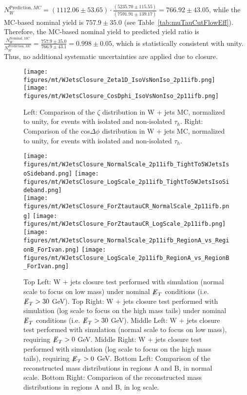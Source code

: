 $N_{W}^{\textrm{Prediction},MC} = (1112.06 \pm 53.65) \cdot \frac{(5235.70 \pm 115.55)}{(7591.91 \pm 139.17)} = 766.92 \pm 43.05$, while the MC-based nominal 
yield is $757.9 \pm 35.0$ (see Table~\ref{tab:muTauCutFlowEff}). Therefore, the MC-based nominal yield to predicted yield ratio is 
$\frac{N_{W}^{\textrm{Nominal},MC}}{N_{W}^{\textrm{Prediction},MC}} = \frac{757.9 \pm 35.0}{766.9 \pm 43.1} = 0.998 \pm 0.05$, which is statistically 
consistent with unity. 
Thus, no additional systematic uncertainties are applied due to closure.

\begin{figure}\centering
  \texttt{[image: figures/mt/WJetsClosure\_Zeta1D\_IsoVsNonIso\_2p11ifb.png]}
  \texttt{[image: figures/mt/WJetsClosure\_CosDphi\_IsoVsNonIso\_2p11ifb.png]}
  \caption{\label{fig:ZetaAndCosDphiVsTauIso} Left: Comparison of the $\zeta$ distribution in W + jets MC, normalized to unity, for events with isolated and 
non-isolated $\tau_{h}$.  Right: Comparison of the cos$\Delta\phi$ distribution in W + jets MC, normalized to unity, for events with isolated and
non-isolated $\tau_{h}$.}
\end{figure}

\begin{figure}\centering
  \texttt{[image: figures/mt/WJetsClosure\_NormalScale\_2p11ifb\_TightTo5WJetsIsoSideband.png]}
  \texttt{[image: figures/mt/WJetsClosure\_LogScale\_2p11ifb\_TightTo5WJetsIsoSideband.png]} \\
  \texttt{[image: figures/mt/WJetsClosure\_ForZtautauCR\_NormalScale\_2p11ifb.png]}
  \texttt{[image: figures/mt/WJetsClosure\_ForZtautauCR\_LogScale\_2p11ifb.png]} \\
  \texttt{[image: figures/mt/WJetsClosure\_NormalScale\_2p11ifb\_RegionA\_vs\_RegionB\_ForIvan.png]}
  \texttt{[image: figures/mt/WJetsClosure\_LogScale\_2p11ifb\_RegionA\_vs\_RegionB\_ForIvan.png]}
  \caption{\label{fig:wJetsClosureMuTau} Top Left: W + jets closure test performed with simulation (normal scale to focus on low mass) under nominal ${\not\mathrel{E}}_T$ 
conditions (i.e. ${\not\mathrel{E}}_T > 30$ GeV).  Top Right: 
W + jets closure test performed with simulation (log scale to focus on the high mass tails) under nominal ${\not\mathrel{E}}_T$
conditions (i.e. ${\not\mathrel{E}}_T > 30$ GeV).  Middle Left: W + jets closure test performed 
with simulation (normal scale to focus on low mass), requiring ${\not\mathrel{E}}_T > 0$ GeV.  Middle Right: W + jets closure test performed with simulation (log scale to 
focus on the high mass tails), requiring ${\not\mathrel{E}}_T > 0$ GeV.  Bottom Left: Comparison of the reconstructed mass distributions in regions A and B, in normal scale.  
Bottom Right: Comparison of the reconstructed mass distributions in regions A and B, in log scale.} 
\end{figure}

